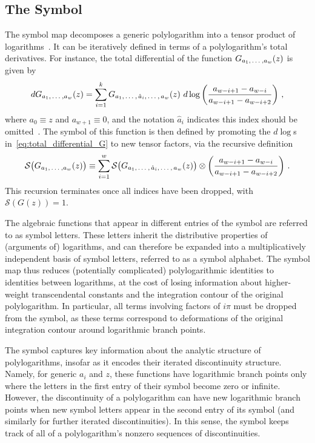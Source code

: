 \documentclass[11pt]{article}
\newcommand{\fwboxL}[2]{\text{\makebox[#1][l]{$#2$}}}
\begin{document}
\subsection{The Symbol}

The symbol map decomposes a generic polylogarithm into a tensor product of logarithms~\cite{Goncharov:2010jf}. It can be iteratively defined in terms of a polylogarithm's total derivatives. For instance, the total differential of the function $G_{a_1, \fwboxL{13pt}{\,\dots}, a_w}(z)$ is given by
\begin{equation} \label{eq:total_differential_G}
d G_{a_1, \fwboxL{13pt}{\,\dots}, a_w}(z) = \sum_{i=1}^{k} G_{a_1,\fwboxL{13pt}{\,\dots},\,\hat{a}_i,\fwboxL{13pt}{\,\dots},\,a_w}(z) \ d\log \left( \frac{a_{w-i+1} - a_{w-i}}{a_{w-i+1} - a_{w-i+2}} \right)\, ,
\end{equation} 
where $a_0 \equiv z$ and $a_{w+1} \equiv 0$, and the notation $\hat{a}_i$ indicates this index should be omitted~\cite{GoncharovMixedTate,Duhr:2011zq}. The symbol of this function is then defined by promoting the $d\log$s in~\eqref{eq:total_differential_G} to new tensor factors, via the recursive definition  
\begin{equation} \label{eq:symbol_def}
\mathcal{S}\big(G_{a_1, \fwboxL{13pt}{\,\dots}, a_w}(z)\big) \equiv \sum_{i=1}^{w} \mathcal{S}\big(G_{a_1,\fwboxL{13pt}{\,\dots},\,\hat{a}_i,\fwboxL{13pt}{\,\dots},\,a_w}(z) \big) \otimes \left( \frac{a_{w-i+1} - a_{w-i}}{a_{w-i+1} - a_{w-i+2}} \right)\, .
\end{equation} 
This recursion terminates once all indices have been dropped, with $\mathcal{S}(G(z)) = 1$.

The algebraic functions that appear in different entries of the symbol are referred to as symbol letters. These letters inherit the distributive properties of (arguments of) logarithms, and can therefore be expanded into a multiplicatively independent basis of symbol letters, referred to as a symbol alphabet. The symbol map thus reduces (potentially complicated) polylogarithmic identities to identities between logarithms, at the cost of losing information about higher-weight transcendental constants and the integration contour of the original polylogarithm. In particular, all terms involving factors of $i\pi$ must be dropped from the symbol, as these terms correspond to deformations of the original integration contour around logarithmic branch points.
 
The symbol captures key information about the analytic structure of polylogarithms, insofar as it encodes their iterated discontinuity structure. Namely, for generic $a_i$ and $z$, these functions have logarithmic branch points only where the letters in the first entry of their symbol become zero or infinite. However, the discontinuity of a polylogarithm can have new logarithmic branch points when new symbol letters appear in the second entry of its symbol (and similarly for further iterated discontinuities). In this sense, the symbol keeps track of all of a polylogarithm's nonzero sequences of discontinuities. 
\end{document}
